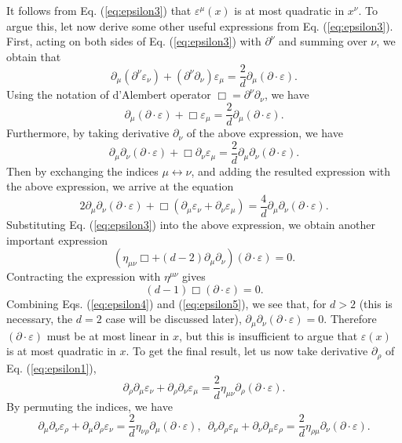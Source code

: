 \documentclass[graybox,envcountchap,sectrefs]{svmono}
\begin{document}
It follows from Eq. (\ref{eq:epsilon3}) that $\varepsilon^{\mu}(x)$ is at most quadratic in $x^{\nu}$. To argue this, let now derive some other useful expressions from Eq. (\ref{eq:epsilon3}). First, acting on both sides of Eq. (\ref{eq:epsilon3}) with $\partial^{\nu}$ and summing over $\nu$, we obtain that
$$\partial_{\mu}(\partial^{\nu}\varepsilon_{\nu})+(\partial^{\nu}\partial_{\nu})\varepsilon_{\mu}=\frac{2}{d} \partial_{\mu}(\partial\cdot \varepsilon).$$
Using the notation of d'Alembert operator $\Box=\partial^{\nu}\partial_{\nu}$, we have
$$\partial_{\mu}(\partial\cdot\varepsilon)+\Box\varepsilon_{\mu}=\frac{2}{d} \partial_{\mu}(\partial\cdot \varepsilon).$$
Furthermore, by taking derivative $\partial_{\nu}$ of the above expression, we have
$$\partial_{\mu}\partial_{\nu}(\partial\cdot \varepsilon)+\Box\partial_{\nu}\varepsilon_{\mu}=\frac{2}{d}\partial_{\mu}\partial_{\nu}(\partial\cdot\varepsilon).$$
Then by exchanging the indices $\mu\leftrightarrow \nu$, and adding the resulted expression with the above expression, we arrive at the equation
$$2\partial_{\mu}\partial_{\nu}(\partial\cdot\varepsilon)+\Box (\partial_{\mu}\varepsilon_{\nu}+\partial_{\nu}\varepsilon_{\mu})=\frac{4}{d}\partial_{\mu}\partial_{\nu}(\partial\cdot \varepsilon).$$
Substituting Eq. (\ref{eq:epsilon3}) into the above expression, we obtain another important expression
\begin{equation}\label{eq:epsilon4}
\boxed{(\eta_{\mu\nu}\Box+(d-2)\partial_{\mu}\partial_{\nu})(\partial\cdot \varepsilon)=0.}
\end{equation}
Contracting the expression with $\eta^{\mu\nu}$ gives
\begin{equation}\label{eq:epsilon5}
\boxed{(d-1)\Box (\partial\cdot \varepsilon)=0.}
\end{equation}
Combining Eqs. (\ref{eq:epsilon4}) and  (\ref{eq:epsilon5}), we see that, for $d>2$ (this is necessary, the $d=2$ case will be discussed later), $\partial_{\mu}\partial_{\nu}(\partial\cdot \varepsilon)=0$. Therefore $(\partial\cdot \varepsilon)$  must be at most linear in $x$, but this is insufficient to argue that $\varepsilon(x)$ is at most quadratic in $x$. To get the final result, let us now take derivative $\partial_{\rho}$ of Eq. (\ref{eq:epsilon1}),
$$\partial_{\rho}\partial_{\mu}\varepsilon_{\nu}+\partial_{\rho}\partial_{\nu}\varepsilon_{\mu}=\frac{2}{d}\eta_{\mu\nu}\partial_{\rho}(\partial\cdot \varepsilon).$$
By permuting the indices, we have
$$\partial_{\mu}\partial_{\nu}\varepsilon_{\rho}+\partial_{\mu}\partial_{\rho}\varepsilon_{\nu}=\frac{2}{d}\eta_{\nu\rho}\partial_{\mu}(\partial\cdot \varepsilon),\,\,\,
\partial_{\nu}\partial_{\rho}\varepsilon_{\mu}+\partial_{\nu}\partial_{\mu}\varepsilon_{\rho}=\frac{2}{d}\eta_{\rho\mu}\partial_{\nu}(\partial\cdot \varepsilon).$$
\end{document}
